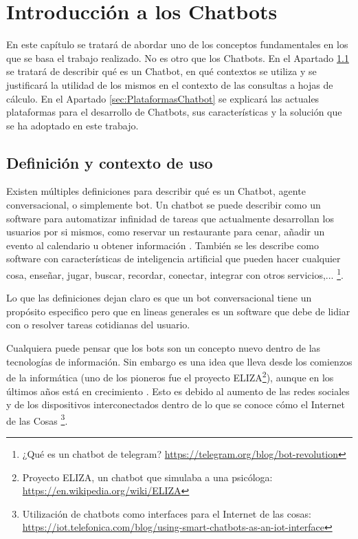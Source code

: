 \chapter{Introducción a los Chatbots}

En este capítulo se tratará de abordar uno de los conceptos fundamentales en los que se basa el trabajo realizado. No es otro que los Chatbots. En el Apartado \ref{sec:DefinicionChatbot} se tratará de describir qué es un Chatbot, en qué contextos se utiliza y se justificará la utilidad de los mismos en el contexto de las consultas a hojas de cálculo. En el Apartado \ref{sec:PlataformasChatbot} se explicará las actuales plataformas para el desarrollo de Chatbots, sus características y la solución que se ha adoptado en este trabajo.

\section{Definición y contexto de uso}
\label{sec:DefinicionChatbot}

Existen múltiples definiciones para describir qué es un Chatbot, agente conversacional, o simplemente bot. Un chatbot se puede describir como un software para automatizar infinidad de tareas que actualmente desarrollan los usuarios por si mismos, como reservar un restaurante para cenar, añadir un evento al calendario u obtener información \cite{Wagner2016}. También se les describe como software con características de inteligencia artificial que pueden hacer cualquier cosa, enseñar, jugar, buscar, recordar, conectar, integrar con otros servicios,... \footnote{¿Qué es un chatbot de telegram? \url{https://telegram.org/blog/bot-revolution}}.

Lo que las definiciones dejan claro es que un bot conversacional tiene un propósito especifico pero que en lineas generales es un software que debe de lidiar con o resolver tareas cotidianas del usuario.

Cualquiera puede pensar que los bots son un concepto nuevo dentro de las tecnologías de información. Sin embargo es una idea que lleva desde los comienzos de la informática (uno de los pioneros fue el proyecto ELIZA\footnote{Proyecto ELIZA, un chatbot que simulaba a una psicóloga: \url{https://en.wikipedia.org/wiki/ELIZA}}), aunque en los últimos años está en crecimiento \cite{Ferrara2016}. Esto es debido al aumento de las redes sociales y de los dispositivos interconectados dentro de lo que se conoce cómo el Internet de las Cosas \footnote{Utilización de chatbots como interfaces para el Internet de las cosas: \url{https://iot.telefonica.com/blog/using-smart-chatbots-as-an-iot-interface}}.

